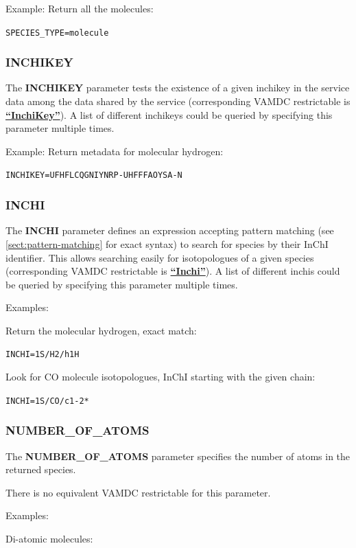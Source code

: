 \documentclass[11pt,a4paper]{ivoa}
\def\vamdcres#1{\href{https://dictionary.vamdc.eu/restrictables/\##1}{\textbf{``\color{vamdccolor}#1''}}}
\newcommand{\parexample}[1]{\noindent\quad\texttt{#1}}
\begin{document}
Example: Return all the molecules:

\parexample{SPECIES\_TYPE=molecule}


\subsubsection{INCHIKEY}

The \textbf{INCHIKEY} parameter tests the existence of a given
inchikey in the service data among the data shared by the service (corresponding
VAMDC restrictable is \vamdcres{InchiKey}). A list of different inchikeys
could be queried by specifying this parameter multiple times.

Example: Return metadata for molecular hydrogen:

\parexample{INCHIKEY=UFHFLCQGNIYNRP-UHFFFAOYSA-N} \\



\subsubsection{INCHI}

The \textbf{INCHI} parameter defines an expression accepting pattern matching
(see \ref{sect:pattern-matching} for exact syntax) to search for species by their InChI identifier.
This allows searching easily for isotopologues of a given species (corresponding
VAMDC restrictable is \vamdcres{Inchi}). A list of different inchis
could be queried by specifying this parameter multiple times.

Examples:

Return the molecular hydrogen, exact match:

\parexample{INCHI=1S/H2/h1H}

Look for CO molecule isotopologues, InChI starting with the given chain:

\parexample{INCHI=1S/CO/c1-2*}


\subsubsection{NUMBER\_OF\_ATOMS}

The \textbf{NUMBER\_OF\_ATOMS} parameter specifies the number of atoms in the returned species.

There is no equivalent VAMDC restrictable for this parameter.

Examples:

Di-atomic molecules:
\end{document}
